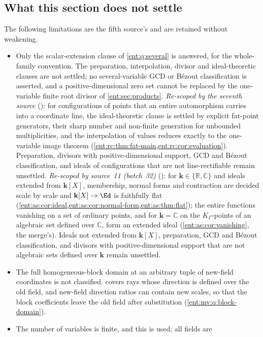 \documentclass[11pt]{article}
\theoremstyle{plain}
\theoremstyle{plain}
\theoremstyle{plain}
\theoremstyle{definition}
\theoremstyle{definition}
\theoremstyle{definition}
\theoremstyle{definition}
\theoremstyle{remark}
\newcommand{\C}{\mathbb C}\newcommand{\R}{\mathbb R}
\newcommand{\K}{K_\Gamma}\newcommand{\KD}{K_\Delta}
\newcommand{\kk}{\mathbf k}\newcommand{\PP}{\mathbb P}
\begin{document}
\subsection{What this section does not settle}
\label{ent:mv:subsec:limits}
The following limitations are the fifth source's and are retained without
weakening.
\begin{itemize}[leftmargin=1.4em]
\item Only the scalar-extension clause of \cref{ent:q:several} is answered,
for the whole-family convention. The preparation, interpolation, divisor
and ideal-theoretic clauses are not settled; no several-variable GCD or
B\'ezout classification is asserted, and a positive-dimensional zero set
cannot be replaced by the one-variable finite root divisor of
\cref{ent:sec:products}. \emph{Re-scoped by the seventh source}
(): for configurations
of points that an entire automorphism carries into a coordinate line, the
ideal-theoretic clause is settled by explicit fat-point generators, their
sharp number and non-finite generation for unbounded multiplicities, and the
interpolation of values reduces exactly to the one-variable image theorem
(\cref{ent:rc:thm:fat-main,ent:rc:cor:evaluation}). Preparation, divisors
with positive-dimensional support, GCD and B\'ezout classification, and ideals
of configurations that are not line-rectifiable remain unsettled.
\emph{Re-scoped by source~11 (batch~32)}
(): for $\kk\in\{\R,\C\}$
and ideals extended from $\kk[X]$, membership, normal forms and contraction are
decided scale by scale and $\kk[X]\to\Ed$ is faithfully flat
(\cref{ent:as:cor:ideal,ent:as:cor:normal-form,ent:as:thm:flat}); the entire
functions vanishing on a set of ordinary points, and for $\kk=\C$ on the
$\K$-points of an algebraic set defined over $\C$, form an extended ideal
(\cref{ent:as:cor:vanishing}, the merge's). Ideals not extended from $\kk[X]$,
preparation, GCD and B\'ezout classification, and divisors with
positive-dimensional support that are not algebraic sets defined over $\kk$
remain unsettled.
\item The full homogeneous-block domain at an arbitrary tuple of new-field
coordinates is not classified.  covers rays whose
direction is defined over the old field, and new-field direction ratios can
contain new scales, so that the block coefficients leave the old field after
substitution (\cref{ent:mv:q:block-domain}).
\item The number of variables is finite, and this is used; all fields are

\end{itemize}
\end{document}
